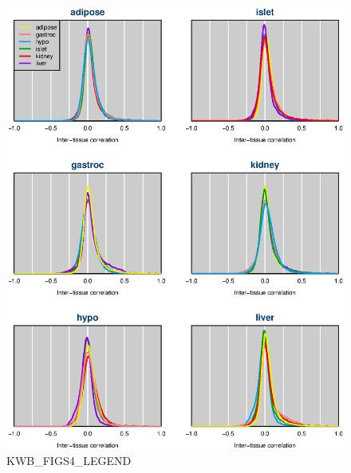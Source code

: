 \documentclass[letterpaper,twoside]{article}
\begin{document}
\clearpage


\begin{figure}[p]
\centerline{\includegraphics{SuppFigs/figS4.eps}}

\caption{KWB_FIGS4_LEGEND}
\end{figure}



\clearpage
\end{document}
